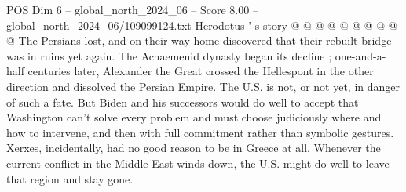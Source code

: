 \begin{textsample}{POS Dim 6 – global\_north\_2024\_06 – Score 8.00 – global\_north\_2024\_06/109099124.txt}
Herodotus ' s story @ @ @ @ @ @ @ @ @ @ The Persians lost, and on their way home discovered that their rebuilt bridge was in ruins yet again.
The Achaemenid dynasty began its decline ; one-and-a-half centuries later, Alexander the Great crossed the Hellespont in the other direction and dissolved the Persian Empire.
The U.S. is not, or not yet, in danger of such a fate.
But Biden and his successors would do well to accept that Washington can't solve every problem and must choose judiciously where and how to intervene, and then with full commitment rather than symbolic gestures.
Xerxes, incidentally, had no good reason to be in Greece at all.
Whenever the current conflict in the Middle East winds down, the U.S. might do well to leave that region and stay gone.

\end{textsample}
